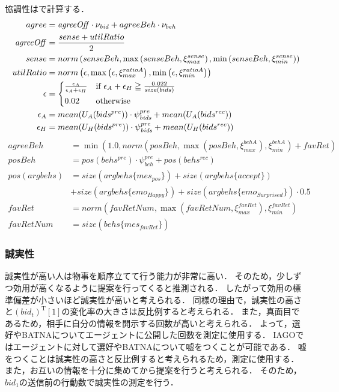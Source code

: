 協調性はで計算する．
\begin{align}
    agree &= \mathit{agreeOff} \cdot \nu_{\mathit{bid}} + agreeBeh \cdot \nu_{beh} \label{eq:agreeableness} \\
    \mathit{agreeOff} &= \frac{sense + utilRatio}{2} \nonumber \\
    sense &= norm \left(senseBeh, \max \left(senseBeh, \xi_{max}^{sense}\right), \min \left(senseBeh, \xi_{min}^{sense}\right) \right) \nonumber \\
    utilRatio &= norm \left(\epsilon, \max \left(\epsilon, \xi_{max}^{ratioA}\right), \min \left(\epsilon, \xi_{min}^{ratioA}\right) \right) \nonumber \\
    \epsilon &= 
    \begin{cases*}
        \frac{\epsilon_A}{\epsilon_A + \epsilon_H} & if $\epsilon_A + \epsilon_H \geqq \frac{0.022}{size(bids)}$  \\
        0.02 & otherwise 
    \end{cases*} \nonumber \\
    \epsilon_A &= mean(U_A(bids^{pre})) \cdot \psi_{\mathit{bids}}^{pre} + mean(U_A(bids^{rec})) \nonumber \\
    \epsilon_H &= mean(U_H(bids^{pre})) \cdot \psi_{\mathit{bids}}^{pre} + mean(U_H(bids^{rec})) \nonumber 
\end{align}
\begin{align}
    agreeBeh &= \min \left( 1.0, norm\left( \mathit{posBeh}, \max \left( \mathit{posBeh}, \xi_{max}^{\mathit{behA}}\right), \xi_{min}^{\mathit{behA}} \right) + \mathit{favRet}\right) \nonumber \\
    posBeh &=  pos(behs^{pre}) \cdot \psi_{beh}^{pre} + pos(behs^{rec}) \nonumber \\
    pos(argbehs) &= size(argbehs\{mes_{pos}\}) + size(argbehs\{accept\}) \nonumber \\
    &+ size(argbehs\{emo_{Happy}\}) \nonumber + size(argbehs\{emo_{Surprised}\}) \cdot 0.5 \nonumber \\
    \mathit{favRet} &= norm\left( \mathit{favRetNum}, \max \left( \mathit{favRetNum}, \xi_{max}^{\mathit{favRet}}\right), \xi_{min}^{\mathit{favRet}} \right) \nonumber \\
    \mathit{favRetNum} &= size(behs\{mes_{\mathit{favRet}}\}) \nonumber
\end{align}

\subsubsection{誠実性}
誠実性が高い人は物事を順序立てて行う能力が非常に高い．
そのため，少しずつ効用が高くなるように提案を行ってくると推測される．
したがって効用の標準偏差が小さいほど誠実性が高いと考えられる．
同様の理由で，誠実性の高さと$(bid_t)^{\mathrm{T}}[1]$の変化率の大きさは反比例すると考えられる．
また，真面目であるため，相手に自分の情報を開示する回数が高いと考えられる．
よって，選好やBATNAについてエージェントに公開した回数を測定に使用する．
IAGOではエージェントに対して選好やBATNAについて嘘をつくことが可能である．
嘘をつくことは誠実性の高さと反比例すると考えられるため，測定に使用する．
また，お互いの情報を十分に集めてから提案を行うと考えられる．
そのため，$bid_1$の送信前の行動数で誠実性の測定を行う．

